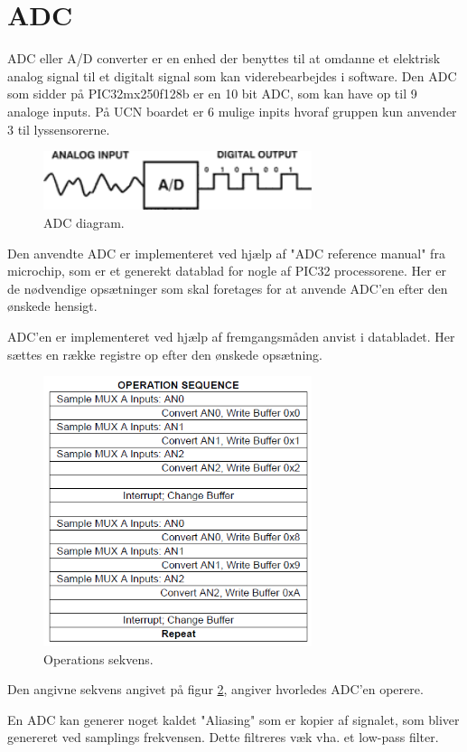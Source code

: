 \section{ADC}
ADC eller A/D converter er en enhed der benyttes til at omdanne et elektrisk analog signal til et digitalt signal som kan viderebearbejdes i software. 
Den ADC som sidder på PIC32mx250f128b er en 10 bit ADC, som kan have op til 9 analoge inputs. På UCN boardet er 6 mulige inpits hvoraf gruppen kun anvender 3 til lyssensorerne. 

\begin{figure}[h!]
  \centering
  \includegraphics[width=0.7\textwidth]{figures/A_D_converter.png}
  \caption{ADC diagram.\cite{ADC_figur}}
  \label{adcDiagram}
\end{figure} 
Den anvendte ADC er implementeret ved hjælp af "ADC reference manual" fra microchip, som er et generekt datablad for nogle af PIC32 processorene. Her er de nødvendige opsætninger som skal foretages for at anvende ADC'en efter den ønskede hensigt.
\newline



ADC'en er implementeret ved hjælp af fremgangsmåden anvist i databladet. Her sættes en række registre op efter den ønskede opsætning. 

\begin{figure}[h!]
  \centering
  \includegraphics[width=0.7\textwidth]{figures/operation_sequence.png}
  \caption{Operations sekvens.}
  \label{handlingsekvens}
\end{figure} 

Den angivne sekvens angivet på figur \ref{handlingsekvens}, angiver hvorledes ADC'en operere. 

En ADC kan generer noget kaldet "Aliasing" som er kopier af signalet, som bliver genereret ved samplings frekvensen. Dette filtreres væk vha. et low-pass filter.